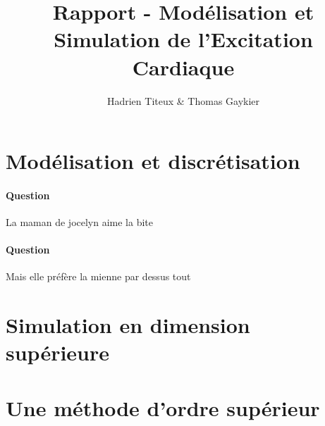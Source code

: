 \documentclass[11pt]{article}
\title{\textbf{Rapport - Modélisation et Simulation de l'Excitation Cardiaque}}
\author{Hadrien Titeux \& Thomas Gaykier}
\date{}
\newcounter{question_num}
\begin{document}
\maketitle

\section{Modélisation et discrétisation}
	\paragraph{Question  \\}
	La maman de jocelyn aime la bite
	
	\paragraph{Question  \\}
	Mais elle préfère la mienne par dessus tout

\section{Simulation en dimension supérieure}

\section{Une méthode d’ordre supérieur }

		
			
\end{document}

